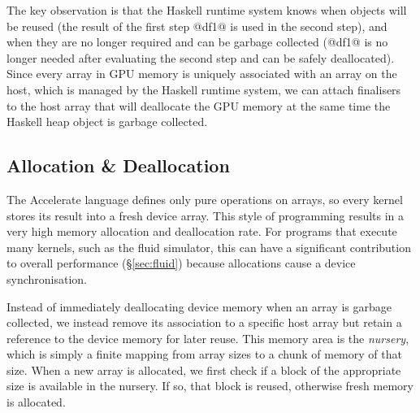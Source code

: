 The key observation is that the Haskell runtime system knows when objects will
be reused (the result of the first step @df1@ is used in the second step), and
when they are no longer required and can be garbage collected (@df1@ is no
longer needed after evaluating the second step and can be safely deallocated).
Since every array in GPU memory is uniquely associated with an array on the
host, which is managed by the Haskell runtime system, we can attach
finalisers~\cite{PeytonJones:2000ks} to the host array that will deallocate the
GPU memory at the same time the Haskell heap object is garbage collected.

% 


\subsection{Allocation \& Deallocation}

The Accelerate language defines only pure operations on arrays, so every kernel
stores its result into a fresh device array. This style of programming results
in a very high memory allocation and deallocation rate. For programs that
execute many kernels, such as the fluid simulator, this can have a
significant contribution to overall performance (\S\ref{sec:fluid}) because
allocations cause a device synchronisation.

Instead of immediately deallocating device memory when an array is garbage
collected, we instead remove its association to a specific host array but retain
a reference to the device memory for later reuse. This memory area is the
\emph{nursery}, which is simply a finite mapping from array sizes to a chunk
of memory of that size. When a new array is allocated, we first check if a block
of the appropriate size is available in the nursery. If so, that block is
reused, otherwise fresh memory is allocated.

% 

